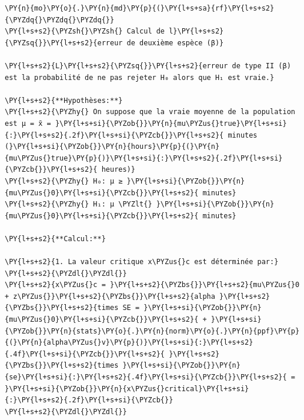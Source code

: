     \begin{tcolorbox}[breakable, size=fbox, boxrule=1pt, pad at break*=1mm,colback=cellbackground, colframe=cellborder]
\begin{Verbatim}[commandchars=\\\{\}]
\PY{n}{mo}\PY{o}{.}\PY{n}{md}\PY{p}{(}\PY{l+s+sa}{rf}\PY{l+s+s2}{\PYZdq{}\PYZdq{}\PYZdq{}}
\PY{l+s+s2}{\PYZsh{}\PYZsh{} Calcul de l}\PY{l+s+s2}{\PYZsq{}}\PY{l+s+s2}{erreur de deuxième espèce (β)}

\PY{l+s+s2}{L}\PY{l+s+s2}{\PYZsq{}}\PY{l+s+s2}{erreur de type II (β) est la probabilité de ne pas rejeter H₀ alors que H₁ est vraie.}

\PY{l+s+s2}{**Hypothèses:**}
\PY{l+s+s2}{\PYZhy{} On suppose que la vraie moyenne de la population est μ = x̄ = }\PY{l+s+si}{\PYZob{}}\PY{n}{mu\PYZus{}true}\PY{l+s+si}{:}\PY{l+s+s2}{.2f}\PY{l+s+si}{\PYZcb{}}\PY{l+s+s2}{ minutes (}\PY{l+s+si}{\PYZob{}}\PY{n}{hours}\PY{p}{(}\PY{n}{mu\PYZus{}true}\PY{p}{)}\PY{l+s+si}{:}\PY{l+s+s2}{.2f}\PY{l+s+si}{\PYZcb{}}\PY{l+s+s2}{ heures)}
\PY{l+s+s2}{\PYZhy{} H₀: μ ≥ }\PY{l+s+si}{\PYZob{}}\PY{n}{mu\PYZus{}0}\PY{l+s+si}{\PYZcb{}}\PY{l+s+s2}{ minutes}
\PY{l+s+s2}{\PYZhy{} H₁: μ \PYZlt{} }\PY{l+s+si}{\PYZob{}}\PY{n}{mu\PYZus{}0}\PY{l+s+si}{\PYZcb{}}\PY{l+s+s2}{ minutes}

\PY{l+s+s2}{**Calcul:**}

\PY{l+s+s2}{1. La valeur critique x\PYZus{}c est déterminée par:}
\PY{l+s+s2}{\PYZdl{}\PYZdl{}}
\PY{l+s+s2}{x\PYZus{}c = }\PY{l+s+s2}{\PYZbs{}}\PY{l+s+s2}{mu\PYZus{}0 + z\PYZus{}}\PY{l+s+s2}{\PYZbs{}}\PY{l+s+s2}{alpha }\PY{l+s+s2}{\PYZbs{}}\PY{l+s+s2}{times SE = }\PY{l+s+si}{\PYZob{}}\PY{n}{mu\PYZus{}0}\PY{l+s+si}{\PYZcb{}}\PY{l+s+s2}{ + }\PY{l+s+si}{\PYZob{}}\PY{n}{stats}\PY{o}{.}\PY{n}{norm}\PY{o}{.}\PY{n}{ppf}\PY{p}{(}\PY{n}{alpha\PYZus{}v}\PY{p}{)}\PY{l+s+si}{:}\PY{l+s+s2}{.4f}\PY{l+s+si}{\PYZcb{}}\PY{l+s+s2}{ }\PY{l+s+s2}{\PYZbs{}}\PY{l+s+s2}{times }\PY{l+s+si}{\PYZob{}}\PY{n}{se}\PY{l+s+si}{:}\PY{l+s+s2}{.4f}\PY{l+s+si}{\PYZcb{}}\PY{l+s+s2}{ = }\PY{l+s+si}{\PYZob{}}\PY{n}{x\PYZus{}critical}\PY{l+s+si}{:}\PY{l+s+s2}{.2f}\PY{l+s+si}{\PYZcb{}}
\PY{l+s+s2}{\PYZdl{}\PYZdl{}}


\end{Verbatim}
\end{tcolorbox}
